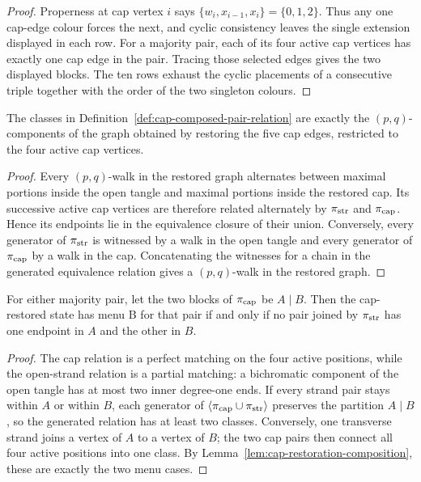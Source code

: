\begin{proof}
Properness at cap vertex $i$ says
$\{w_i,x_{i-1},x_i\}=\{0,1,2\}$.  Thus any one cap-edge colour forces the
next, and cyclic consistency leaves the single extension displayed in each
row.  For a majority pair, each of its four active cap vertices has exactly
one cap edge in the pair.  Tracing those selected edges gives the two
displayed blocks.  The ten rows exhaust the cyclic placements of a
consecutive triple together with the order of the two singleton colours.
\end{proof}

\begin{lemma}
\label{lem:cap-restoration-composition}
The classes in Definition~\ref{def:cap-composed-pair-relation} are exactly
the $(p,q)$-components of the graph obtained by restoring the five cap edges,
restricted to the four active cap vertices.
\end{lemma}

\begin{proof}
Every $(p,q)$-walk in the restored graph alternates between maximal portions
inside the open tangle and maximal portions inside the restored cap.  Its
successive active cap vertices are therefore related alternately by
$\pi_{\rm str}$ and $\pi_{\rm cap}$.  Hence its endpoints lie in the
equivalence closure of their union.  Conversely, every generator of
$\pi_{\rm str}$ is witnessed by a walk in the open tangle and every generator
of $\pi_{\rm cap}$ by a walk in the cap.  Concatenating the witnesses for a
chain in the generated equivalence relation gives a $(p,q)$-walk in the
restored graph.
\end{proof}

\begin{lemma}
\label{lem:menu-b-transverse-chord}
For either majority pair, let the two blocks of
$\pi_{\rm cap}$ be $A\mid B$.  Then the cap-restored state has menu B
for that pair if and only if no pair joined by $\pi_{\rm str}$ has one
endpoint in $A$ and the other in $B$.
\end{lemma}

\begin{proof}
The cap relation is a perfect matching on the four active positions, while
the open-strand relation is a partial matching: a bichromatic component of
the open tangle has at most two inner degree-one ends.  If every strand pair
stays within $A$ or within $B$, each generator of
$\langle\pi_{\rm cap}\cup\pi_{\rm str}\rangle$ preserves the partition
$A\mid B$, so the generated relation has at least two classes.  Conversely,
one transverse strand joins a vertex of $A$ to a vertex of $B$; the two
cap pairs then connect all four active positions into one class.  By
Lemma~\ref{lem:cap-restoration-composition}, these are exactly the two
menu cases.
\end{proof}


